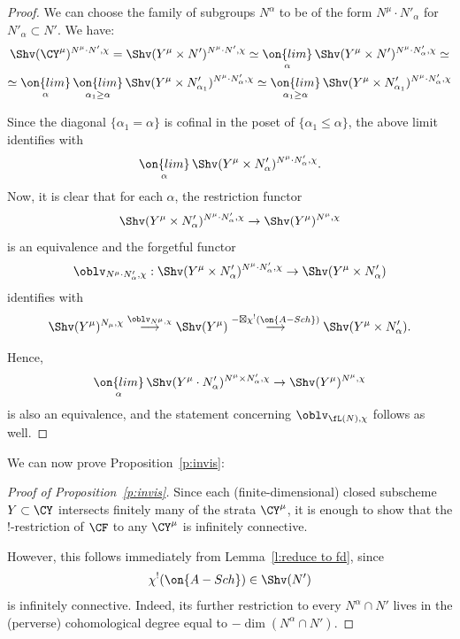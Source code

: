 \documentclass[9pt]{amsart}
\theoremstyle{definition}
\theoremstyle{remark}
\newcommand{\lemref}[1]{Lemma~\ref{#1}}
\newcommand{\propref}[1]{Proposition~\ref{#1}}
\numberwithin{equation}{section}
\begin{document}
\begin{proof}

We can choose the family of subgroups $N^\alpha$ to be of the form $N^\mu \cdot N'_\alpha$
for $N'_\alpha\subset N'$. We have:
\begin{multline*}
\Shv(\CY^\mu)^{N^\mu\cdot N',\chi}=
\Shv(Y^\mu\times N')^{N^\mu\cdot N',\chi}\simeq
\underset{\alpha}{\on{lim}}\, \Shv(Y^\mu\times N')^{N^\mu\cdot N'_\alpha,\chi}\simeq \\
\simeq \underset{\alpha}{\on{lim}}\, \underset{\alpha_1\geq \alpha}{\on{lim}}\,  
\Shv(Y^\mu\times N'_{\alpha_1})^{N^\mu\cdot N'_\alpha,\chi}
\simeq  \underset{\alpha_1\geq \alpha}{\on{lim}}\, \Shv(Y^\mu\times N'_{\alpha_1})^{N^\mu\cdot N'_\alpha,\chi}
\end{multline*}

Since the diagonal $\{\alpha_1=\alpha\}$ is cofinal in the poset of $\{\alpha_1\leq \alpha\}$, the above limit
identifies with 
$$\underset{\alpha}{\on{lim}}\, \Shv(Y^\mu\times N'_\alpha)^{N^\mu\cdot N'_\alpha,\chi}.$$
Now, it is clear that for each $\alpha$, the restriction functor 
$$\Shv(Y^\mu\times N'_\alpha)^{N^\mu\cdot N'_\alpha,\chi}\to \Shv(Y^\mu)^{N^\mu,\chi}$$
is an equivalence and the forgetful functor
$$\oblv_{N^\mu\cdot N'_\alpha,\chi}: \Shv(Y^\mu\times N'_\alpha)^{N^\mu\cdot N'_\alpha,\chi}\to 
\Shv(Y^\mu\times N'_\alpha)$$
identifies with 
$$\Shv(Y^\mu)^{N_\mu,\chi}\overset{\oblv_{N^\mu,\chi}} \longrightarrow 
\Shv(Y^\mu)\overset{-\boxtimes \chi^!(\on{A-Sch})}\longrightarrow 
\Shv(Y^\mu\times N'_\alpha).$$

\medskip

Hence,
$$\underset{\alpha}{\on{lim}}\, \Shv(Y^\mu\cdot N'_\alpha)^{N^\mu\times N'_\alpha,\chi}\to 
\Shv(Y^\mu)^{N^\mu,\chi}$$
is also an equivalence, and the statement concerning $\oblv_{\fL(N),\chi}$ follows as well.

\end{proof} 

We can now prove \propref{p:invis}:

\begin{proof}[Proof of \propref{p:invis}]

Since each (finite-dimensional) closed subscheme $Y\subset \CY$ intersects finitely many of the strata $\CY^\mu$,
it is enough to show that the !-restriction 
of $\CF$ to any $\CY^\mu$ is infinitely connective.

\medskip

However, this follows immediately from \lemref{l:reduce to fd}, since 
 $$\chi^!(\on{A-Sch})\in \Shv(N')$$
is infinitely connective. Indeed, its further restriction to every $N^\alpha\cap N'$ lives in the (perverse) cohomological
degree equal to $-\dim(N^\alpha\cap N')$.

\end{proof} 
\end{document}
